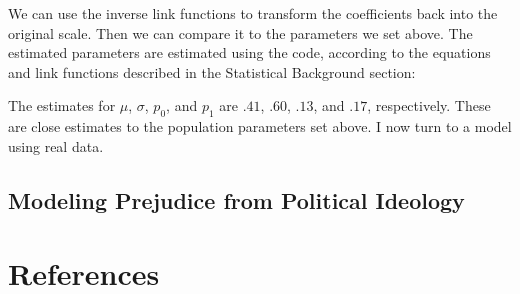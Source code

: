 \documentclass[english,man]{apa6}
\newenvironment{Shaded}{\begin{snugshade}}{\end{snugshade}}
\newcommand{\KeywordTok}[1]{\textcolor[rgb]{0.13,0.29,0.53}{\textbf{#1}}}
\newcommand{\DecValTok}[1]{\textcolor[rgb]{0.00,0.00,0.81}{#1}}
\newcommand{\StringTok}[1]{\textcolor[rgb]{0.31,0.60,0.02}{#1}}
\newcommand{\CommentTok}[1]{\textcolor[rgb]{0.56,0.35,0.01}{\textit{#1}}}
\newcommand{\ControlFlowTok}[1]{\textcolor[rgb]{0.13,0.29,0.53}{\textbf{#1}}}
\newcommand{\OperatorTok}[1]{\textcolor[rgb]{0.81,0.36,0.00}{\textbf{#1}}}
\newcommand{\NormalTok}[1]{#1}
\theoremstyle{definition}
\theoremstyle{definition}
\theoremstyle{remark}
\begin{document}
We can use the inverse link functions to transform the coefficients back
into the original scale. Then we can compare it to the parameters we set
above. The estimated parameters are estimated using the code, according
to the equations and link functions described in the Statistical
Background section:

\begin{Shaded}
\end{Shaded}

The estimates for \(\mu\), \(\sigma\), \(p_0\), and \(p_1\) are \(.41\),
\(.60\), \(.13\), and \(.17\), respectively. These are close estimates
to the population parameters set above. I now turn to a model using real
data.

\subsection{Modeling Prejudice from Political
Ideology}\label{modeling-prejudice-from-political-ideology}

\newpage

\section{References}\label{references}
\end{document}

